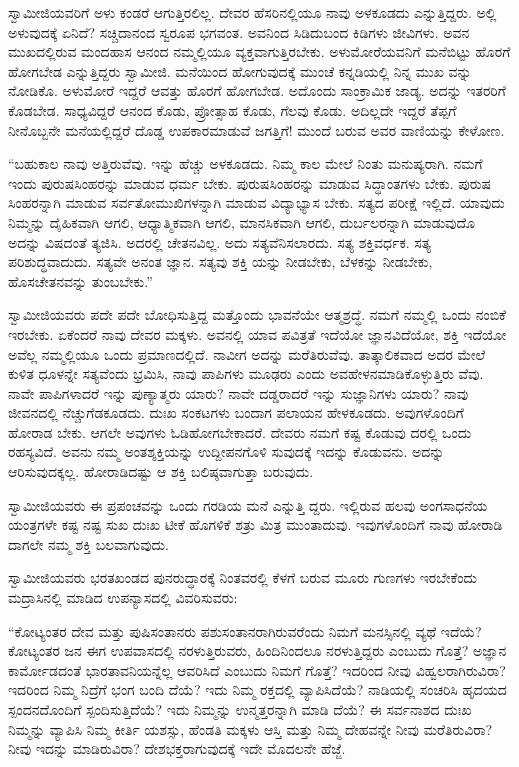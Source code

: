 ಸ್ವಾಮೀಜಿಯವರಿಗೆ ಅಳು ಕಂಡರೆ ಆಗುತ್ತಿರಲಿಲ್ಲ. ದೇವರ ಹೆಸರಿನಲ್ಲಿಯೂ ನಾವು ಅಳಕೂಡದು ಎನ್ನುತ್ತಿದ್ದರು. ಅಲ್ಲಿ ಅಳುವುದಕ್ಕೆ ಏನಿದೆ? ಸಚ್ಚಿದಾನಂದ ಸ್ವರೂಪ ಭಗವಂತ. ಅವನಿಂದ ಸಿಡಿದುಬಂದ ಕಿಡಿಗಳು ಜೀವಿಗಳು. ಅವನ ಮುಖದಲ್ಲಿರುವ ಮಂದಹಾಸ ಆನಂದ ನಮ್ಮಲ್ಲಿಯೂ ವ್ಯಕ್ತವಾಗುತ್ತಿರಬೇಕು. ಅಳುಮೋರೆಯವನಿಗೆ ಮನೆಬಿಟ್ಟು ಹೊರಗೆ ಹೋಗಬೇಡ ಎನ್ನುತ್ತಿದ್ದರು ಸ್ವಾಮೀಜಿ. ಮನೆಯಿಂದ ಹೋಗುವುದಕ್ಕೆ ಮುಂಚೆ ಕನ್ನಡಿಯಲ್ಲಿ ನಿನ್ನ ಮುಖ ವನ್ನು ನೋಡಿಕೊ. ಅಳುಮೋರೆ ಇದ್ದರೆ ಆವತ್ತು ಹೊರಗೆ ಹೋಗಬೇಡ. ಅದೊಂದು ಸಾಂಕ್ರಾಮಿಕ ಜಾಡ್ಯ. ಅದನ್ನು ಇತರರಿಗೆ ಕೊಡಬೇಡ. ಸಾಧ್ಯವಿದ್ದರೆ ಆನಂದ ಕೊಡು, ಪ್ರೋತ್ಸಾಹ ಕೊಡು, ಗೆಲವು ಕೊಡು. ಅದಿಲ್ಲದೇ ಇದ್ದರೆ ತೆಪ್ಪಗೆ ನೀನೊಬ್ಬನೇ ಮನೆಯಲ್ಲಿದ್ದರೆ ದೊಡ್ಡ ಉಪಕಾರಮಾಡುವೆ ಜಗತ್ತಿಗೆ! ಮುಂದೆ ಬರುವ ಅವರ ವಾಣಿಯನ್ನು ಕೇಳೋಣ.

“ಬಹುಕಾಲ ನಾವು ಅತ್ತಿರುವೆವು. ಇನ್ನು ಹೆಚ್ಚು ಅಳಕೂಡದು. ನಿಮ್ಮ ಕಾಲ ಮೇಲೆ ನಿಂತು ಮನುಷ್ಯರಾಗಿ. ನಮಗೆ ಇಂದು ಪುರುಷಸಿಂಹರನ್ನು ಮಾಡುವ ಧರ್ಮ ಬೇಕು. ಪುರುಷಸಿಂಹರನ್ನು ಮಾಡುವ ಸಿದ್ಧಾಂತಗಳು ಬೇಕು. ಪುರುಷ ಸಿಂಹರನ್ನಾಗಿ ಮಾಡುವ ಸರ್ವತೋಮುಖಿಗಳನ್ನಾಗಿ ಮಾಡುವ ವಿದ್ಯಾಭ್ಯಾಸ ಬೇಕು. ಸತ್ಯದ ಪರೀಕ್ಷೆ ಇಲ್ಲಿದೆ. ಯಾವುದು ನಿಮ್ಮನ್ನು ದೈಹಿಕವಾಗಿ ಆಗಲಿ, ಆಧ್ಯಾತ್ಮಿಕವಾಗಿ ಆಗಲಿ, ಮಾನಸಿಕವಾಗಿ ಆಗಲಿ, ದುರ್ಬಲರನ್ನಾಗಿ ಮಾಡುವುದೊ ಅದನ್ನು ವಿಷದಂತೆ ತ್ಯಜಿಸಿ. ಅದರಲ್ಲಿ ಚೇತನವಿಲ್ಲ. ಅದು ಸತ್ಯವೆನಿಸಲಾರದು. ಸತ್ಯ ಶಕ್ತಿವರ್ಧಕ. ಸತ್ಯ ಪರಿಶುದ್ಧವಾದುದು. ಸತ್ಯವೇ ಅನಂತ ಜ್ಞಾನ. ಸತ್ಯವು ಶಕ್ತಿ ಯನ್ನು ನೀಡಬೇಕು, ಬೆಳಕನ್ನು ನೀಡಬೇಕು, ಹೊಸಚೇತನವನ್ನು ತುಂಬಬೇಕು.”

ಸ್ವಾಮೀಜಿಯವರು ಪದೇ ಪದೇ ಬೋಧಿಸುತ್ತಿದ್ದ ಮತ್ತೊಂದು ಭಾವನೆಯೇ ಆತ್ಮಶ್ರದ್ಧೆ. ನಮಗೆ ನಮ್ಮಲ್ಲಿ ಒಂದು ನಂಬಿಕೆ ಇರಬೇಕು. ಏಕೆಂದರೆ ನಾವು ದೇವರ ಮಕ್ಕಳು. ಅವನಲ್ಲಿ ಯಾವ ಪವಿತ್ರತೆ ಇದೆಯೋ ಜ್ಞಾನವಿದೆಯೋ, ಶಕ್ತಿ ಇದೆಯೋ ಅವೆಲ್ಲ ನಮ್ಮಲ್ಲಿಯೂ ಒಂದು ಪ್ರಮಾಣದಲ್ಲಿದೆ. ನಾವೀಗ ಅದನ್ನು ಮರೆತಿರುವೆವು. ತಾತ್ಕಾಲಿಕವಾದ ಅದರ ಮೇಲೆ ಕುಳಿತ ಧೂಳನ್ನೇ ಸತ್ಯವೆಂದು ಭ್ರಮಿಸಿ, ನಾವು ಪಾಪಿಗಳು ಮೂಢರು ಎಂದು ಅವಹೇಳನಮಾಡಿಕೊಳ್ಳುತ್ತಿರು ವೆವು. ನಾವೇ ಪಾಪಿಗಳಾದರೆ ಇನ್ನು ಪುಣ್ಯಾತ್ಮರು ಯಾರು? ನಾವೇ ದಡ್ಡರಾದರೆ ಇನ್ನು ಸುಜ್ಞಾನಿಗಳು ಯಾರು? ನಾವು ಜೀವನದಲ್ಲಿ ನೆಚ್ಚುಗೆಡಕೂಡದು. ದುಃಖ ಸಂಕಟಗಳು ಬಂದಾಗ ಪಲಾಯನ ಹೇಳಕೂಡದು. ಅವುಗಳೊಂದಿಗೆ ಹೋರಾಡ ಬೇಕು. ಆಗಲೇ ಅವುಗಳು ಓಡಿಹೋಗಬೇಕಾದರೆ. ದೇವರು ನಮಗೆ ಕಷ್ಟ ಕೊಡುವು ದರಲ್ಲಿ ಒಂದು ರಹಸ್ಯವಿದೆ. ಅವನು ನಮ್ಮ ಅಂತಶ್ಶಕ್ತಿಯನ್ನು ಉದ್ದೀಪನಗೊಳಿ ಸುವುದಕ್ಕೆ ಇದನ್ನು ಕೊಡುವನು. ಅದನ್ನು ಆರಿಸುವುದಕ್ಕಲ್ಲ. ಹೋರಾಡಿದಷ್ಟು ಆ ಶಕ್ತಿ ಬಲಿಷ್ಠವಾಗುತ್ತಾ ಬರುವುದು.

ಸ್ವಾಮೀಜಿಯವರು ಈ ಪ್ರಪಂಚವನ್ನು ಒಂದು ಗರಡಿಯ ಮನೆ ಎನ್ನುತ್ತಿ ದ್ದರು. ಇಲ್ಲಿರುವ ಹಲವು ಅಂಗಸಾಧನೆಯ ಯಂತ್ರಗಳೇ ಕಷ್ಟ ನಷ್ಟ ಸುಖ ದುಃಖ ಟೀಕೆ ಹೊಗಳಿಕೆ ಶತ್ರು ಮಿತ್ರ ಮುಂತಾದುವು. ಇವುಗಳೊಂದಿಗೆ ನಾವು ಹೋರಾಡಿ ದಾಗಲೇ ನಮ್ಮ ಶಕ್ತಿ ಬಲವಾಗುವುದು.

ಸ್ವಾಮೀಜಿಯವರು ಭರತಖಂಡದ ಪುನರುದ್ಧಾರಕ್ಕೆ ನಿಂತವರಲ್ಲಿ ಕೆಳಗೆ ಬರುವ ಮೂರು ಗುಣಗಳು ಇರಬೇಕೆಂದು ಮದ್ರಾಸಿನಲ್ಲಿ ಮಾಡಿದ ಉಪನ್ಯಾಸದಲ್ಲಿ ವಿವರಿಸುವರು:

“ಕೋಟ್ಯಂತರ ದೇವ ಮತ್ತು ಪುಷಿಸಂತಾನರು ಪಶುಸಂತಾನರಾಗಿರುವರೆಂದು ನಿಮಗೆ ಮನಸ್ಸಿನಲ್ಲಿ ವ್ಯಥೆ ಇದೆಯೆ? ಕೋಟ್ಯಂತರ ಜನ ಈಗ ಉಪವಾಸದಲ್ಲಿ ನರಳುತ್ತಿರುವರು, ಹಿಂದಿನಿಂದಲೂ ನರಳುತ್ತಿದ್ದರು ಎಂಬುದು ಗೊತ್ತೆ? ಅಜ್ಞಾನ ಕಾರ್ಮೋಡದಂತೆ ಭಾರತಾವನಿಯನ್ನೆಲ್ಲ ಆವರಿಸಿದೆ ಎಂಬುದು ನಿಮಗೆ ಗೊತ್ತೆ? ಇದರಿಂದ ನೀವು ವಿಹ್ವಲರಾಗಿರುವಿರಾ? ಇದರಿಂದ ನಿಮ್ಮ ನಿದ್ರೆಗೆ ಭಂಗ ಬಂದಿ ದೆಯೆ? ಇದು ನಿಮ್ಮ ರಕ್ತದಲ್ಲಿ ವ್ಯಾಪಿಸಿದೆಯೆ? ನಾಡಿಯಲ್ಲಿ ಸಂಚರಿಸಿ ಹೃದಯದ ಸ್ಪಂದನದೊಂದಿಗೆ ಸ್ಪಂದಿಸುತ್ತಿದೆಯೆ? ಇದು ನಿಮ್ಮನ್ನು ಉನ್ಮತ್ತರನ್ನಾಗಿ ಮಾಡಿ ದೆಯೆ? ಈ ಸರ್ವನಾಶದ ದುಃಖ ನಿಮ್ಮನ್ನು ವ್ಯಾಪಿಸಿ ನಿಮ್ಮ ಕೀರ್ತಿ ಯಶಸ್ಸು, ಹೆಂಡತಿ ಮಕ್ಕಳು ಆಸ್ತಿ ಮತ್ತು ನಿಮ್ಮ ದೇಹವನ್ನೇ ನೀವು ಮರೆತಿರುವಿರಾ? ನೀವು ಇದನ್ನು ಮಾಡಿರುವಿರಾ? ದೇಶಭಕ್ತರಾಗುವುದಕ್ಕೆ ಇದೇ ಮೊದಲನೇ ಹೆಜ್ಜೆ.

